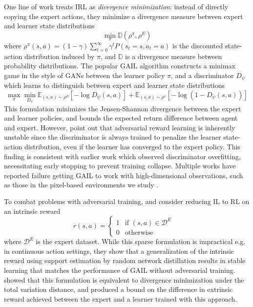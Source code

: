 \documentclass[10pt]{article} %
\theoremstyle{plain}
\theoremstyle{definition}
\theoremstyle{remark}
\begin{document}
One line of work treats IRL as \emph{divergence minimization}: instead of directly copying the expert actions, they minimize a divergence measure between expert and learner state distributions
\begin{equation}\label{divergence}
    \min_\pi \mathbb{D}\left( \rho^\pi, \rho^E\right)
\end{equation}
where $\rho^\pi(s,a) = (1-\gamma)\sum_{t=0}^\infty \gamma^t P(s_t=s, a_t=a)$ is the discounted state-action distribution induced by $\pi$, and $\mathbb{D}$ is a divergence measure between probability distributions. The popular GAIL algorithm \citep{GAIL} constructs a minimax game in the style of GANs \citep{gans} between the learner policy $\pi$, and a discriminator $D_\psi$ which learns to distinguish between expert and learner state distributions
\begin{equation}\label{GAN}
    \max_\pi \min_{D_\psi} \mathbb{E}_{(s,a) \sim \rho^E} 
    \left[ - \log D_\psi(s,a)\right] + \mathbb{E}_{(s,a) \sim \rho^\pi} 
    \left[ -\log\left( 1-D_\psi(s,a)\right)\right]
\end{equation}
 This formulation minimizes the Jensen-Shannon divergence between the expert and learner policies, and bounds the expected return difference between agent and expert. However, \citet{randomexpert} point out that adversarial reward learning is inherently unstable since the discriminator is always trained to penalize the learner state-action distribution, even if the learner has converged to the expert policy. This finding is consistent with earlier work \citep{brock2018large} which observed discriminator overfitting, necessitating early stopping to prevent training collapse. Multiple works have reported failure getting GAIL to work with high-dimensional observations, such as those in the pixel-based environments we study \citep{DRIL} \citep{sqil}.
 
 To combat problems with adversarial training, \citet{randomexpert} and \citet{sqil} consider reducing IL to RL on an intrinsic reward
 \begin{equation}
     r(s,a) = \begin{cases}
             1  & \text{if } (s,a) \in \mathcal{D}^E \\
             0  & \text{otherwise}
       \end{cases} \quad
 \end{equation}
where $\mathcal{D}^E$ is the expert dataset. While this sparse formulation is impractical e.g. in continuous action settings, they show that a generalization of the intrinsic reward using support estimation by random network distillation \citep{rnd} results in stable learning that matches the performance of GAIL without adversarial training. \citet{ILbyRL} showed that this formulation is equivalent to divergence minimization under the total variation distance, and produced a bound on the difference in extrinsic reward achieved between the expert and a learner trained with this approach.
\end{document}
